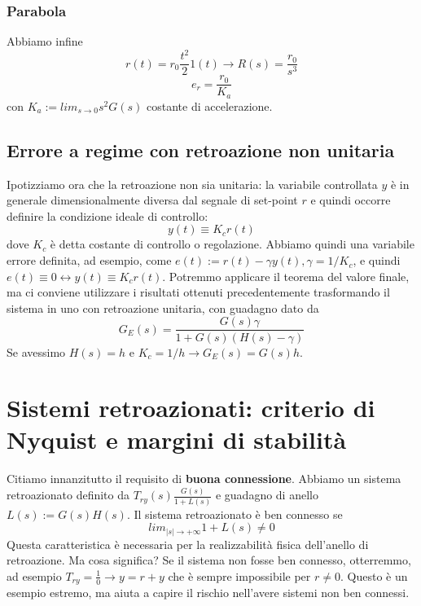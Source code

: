 \documentclass[11pt]{article}
\begin{document}
\subsubsection{Parabola}
Abbiamo infine 
\begin{displaymath}
    r(t) = r_0 \frac{t^2}{2}1(t) \rightarrow R(s)=\frac{r_0}{s^3}
\end{displaymath}
\begin{displaymath}
    e_r = \frac{r_0}{K_a}
\end{displaymath}
con $K_a := lim_{s\rightarrow0} s^2G(s)$ costante di accelerazione. 
\subsection{Errore a regime con retroazione non unitaria}
Ipotizziamo ora che la retroazione non sia unitaria: la variabile controllata $y$ è in generale dimensionalmente diversa dal segnale di set-point $r$ e quindi occorre definire la condizione ideale di controllo:
\begin{displaymath}
    y(t) \equiv K_c r(t)
\end{displaymath}
dove $K_c$ è detta costante di controllo o regolazione. Abbiamo quindi una variabile errore definita, ad esempio, come $e(t):=r(t) - \gamma y(t), \gamma=1/K_c$, e quindi $e(t) \equiv 0 \leftrightarrow y(t) \equiv K_cr(t)$. 
Potremmo applicare il teorema del valore finale, ma ci conviene utilizzare i risultati ottenuti precedentemente trasformando il sistema in uno con retroazione unitaria, con guadagno dato da 
\begin{displaymath}
    G_E(s) = \frac{G(s)\gamma}{1+G(s)(H(s)-\gamma)}
\end{displaymath}
Se avessimo $H(s) = h$ e $K_c = 1/h \rightarrow G_E(s) = G(s)h$.
\section{Sistemi retroazionati: criterio di Nyquist e margini di stabilità}
Citiamo innanzitutto il requisito di \textbf{buona connessione}. Abbiamo un sistema retroazionato definito da $T_{ry}(s)\frac{G(s)}{1+L(s)}$ e guadagno di anello $L(s):=G(s)H(s)$. Il sistema retroazionato è ben connesso se 
\begin{displaymath}
    lim_{|s|\rightarrow+\infty} 1+L(s) \neq 0
\end{displaymath}
Questa caratteristica è necessaria per la realizzabilità fisica dell'anello di retroazione. Ma cosa significa? Se il sistema non fosse ben connesso, otterremmo, ad esempio $T_{ry}=\frac{1}{0}\rightarrow y=r+y$ che è sempre impossibile per $r\neq 0$. Questo è un esempio estremo, ma aiuta a capire il rischio nell'avere sistemi non ben connessi.
\end{document}
